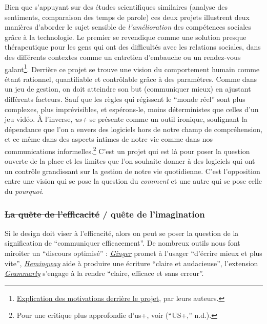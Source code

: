 \documentclass[]{article}
\begin{document}
Bien que s'appuyant sur des études scientifiques similaires (analyse des
sentiments, comparaison des temps de parole) ces deux projets illustrent
deux manières d'aborder le sujet sensible de \emph{l'amélioration} des
compétences sociales grâce à la technologie. Le premier se revendique
comme une solution presque thérapeutique pour les gens qui ont des
difficultés avec les relations sociales, dans des différents contextes
comme un entretien d'embauche ou un rendez-vous galant\footnote{\href{https://www.youtube.com/watch?v=l3ztu9shfMg}{Explication
  des motivations derrière le projet}, par leurs auteurs.}. Derrière ce
projet se trouve une vision du comportement humain comme étant
rationnel, quantifiable et contrôlable grâce à des paramètres. Comme
dans un jeu de gestion, on doit atteindre son but (communiquer mieux) en
ajustant différents facteurs. Sauf que les règles qui régissent le
``monde réel'' sont plus complexes, plus imprévisibles, et espérons-le,
moins déterministes que celles d'un jeu vidéo. À l'inverse, \emph{us+}
se présente comme un outil ironique, soulignant la dépendance que l'on a
envers des logiciels hors de notre champ de compréhension, et ce même
dans des aspects intimes de notre vie comme dans nos communications
informelles.\footnote{Pour une critique plus approfondie d'us+, voir
  (``US+,'' n.d.).} C'est un projet qui est là pour poser la question
ouverte de la place et les limites que l'on souhaite donner à des
logiciels qui ont un contrôle grandissant sur la gestion de notre vie
quotidienne. C'est l'opposition entre une vision qui se pose la question
du \emph{comment} et une autre qui se pose celle du \emph{pourquoi}.

\newpage

\hypertarget{la-quuxeate-de-lefficacituxe9-quuxeate-de-limagination}{%
\subsubsection{\texorpdfstring{\sout{La quête de l'efficacité} / quête
de
l'imagination}{La quête de l'efficacité / quête de l'imagination}}\label{la-quuxeate-de-lefficacituxe9-quuxeate-de-limagination}}

Si le design doit viser à l'efficacité, alors on peut se poser la
question de la signification de ``communiquer efficacement''. De
nombreux outils nous font miroiter un ``discours optimisé'' :
\href{http://www.gingersoftware.com/fr}{\emph{Ginger}} promet à l'usager
``d'écrire mieux et plus vite'',
\href{http://www.hemingwayapp.com/}{\emph{Hemingway}} aide à produire
une écriture ``claire et audacieuse'', l'extension
\href{https://www.grammarly.com/}{\emph{Grammarly}} s'engage à la rendre
``claire, efficace et sans erreur''.
\end{document}
